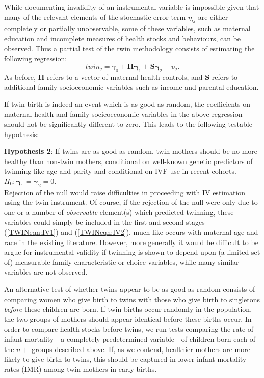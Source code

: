 \documentclass[subeqn]{article}
\begin{document}
\begin{spacing}{1.4}
While documenting invalidity of an instrumental variable is impossible
given that many of the relevant elements of the stochastic error term
$\eta_{ij}$ are either completely or partially unobservable, some of these
variables, such as maternal education and incomplete measures of health
stocks and behaviours, can be observed.  Thus a partial test of the twin
methodology consists of estimating the following regression:
\begin{equation}
  \label{TWINeqn:twinreg}
  twin_{j}=\gamma_0 + \bm{H}\bm{\gamma}_1 + \bm{S}\bm{\gamma}_2 + \upsilon_{j}.
\end{equation}
As before, $\bm{H}$ refers to a vector of maternal health controls, and
$\bm{S}$ refers to additional family socioeconomic variables such as income
and parental education.

If twin birth is indeed an event which is as good as random, the coefficients
on maternal health and family socieoeconomic variables in the above regression
should not be significantly different to zero.  This leads to the following
testable hypothesis:

\noindent %
\textbf{Hypothesis 2}: If twins are as good as random, twin mothers should be no more
healthy than non-twin mothers, conditional on well-known genetic predictors of twinning
like age and parity and conditional on IVF use in recent cohorts.
$H_0: \bm{\gamma}_1 = \bm{\gamma}_2 = 0$. \\
Rejection of the null would raise difficulties in proceeding with IV estimation
using the twin instrument. Of course, if the rejection of the null were only due
to one or a number of \emph{observable} element(s) which predicted twinning,
these variables could simply be included in the first and second stages
(\ref{TWINeqn:IV1}) and (\ref{TWINeqn:IV2}),
much like occurs with maternal age and race in the existing literature.  However,
more generally it would be difficult to be argue for instrumental validity if
twinning is shown to depend upon (a limited set of) measurable family
characteristic or choice variables, while many similar variables are not observed.

An alternative test of whether twins appear to be as good as random consists of
comparing women who give birth to twins with those who give birth to singletons
\emph{before} these children are born.  If twin births occur randomly in the
population, the two groups of mothers should appear identical before these births
occur. In order to compare health stocks before twins, we run tests comparing the
rate of infant mortality---a completely predetermined variable---of children born
each of the $n+$ groups described above.  If, as we contend, healthier mothers
are more likely to give birth to twins, this should be captured in lower infant
mortality rates (IMR) among twin mothers in early births.


\end{spacing}
\end{document}
